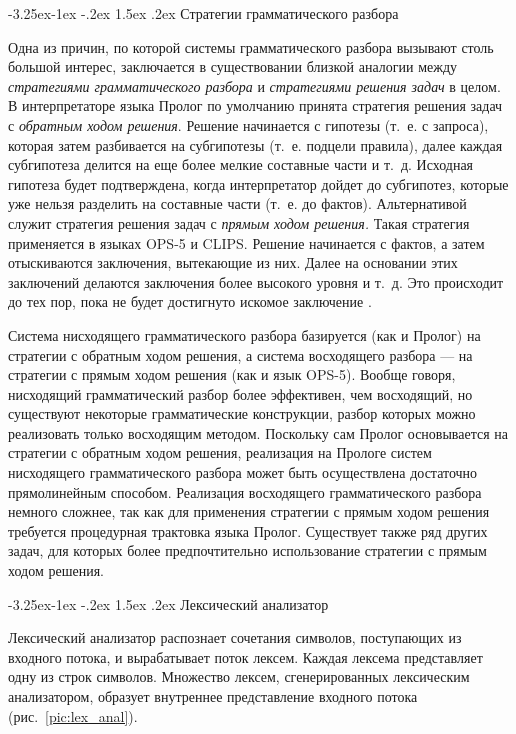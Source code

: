 \documentclass[12pt, openany, twoside]{book} %
\makeatletter
\renewcommand\subsection{\@startsection{subsection}{2}{\z@}%
                                     {-3.25ex\@plus -1ex \@minus -.2ex}%
                                     {1.5ex \@plus .2ex}%
                                     {\normalfont\normalsize\bfseries}}
\makeatother
\begin{document}
\subsection{Стратегии грамматического разбора}

Одна из причин, по которой системы грамматического разбора вызывают столь большой интерес, заключается в существовании близкой аналогии между \emph{стратегиями грамматического разбора} и \emph{стратегиями решения задач} в целом. В интерпретаторе языка Пролог по умолчанию принята стратегия решения задач с \emph{обратным ходом решения}. Решение начинается с гипотезы (т.~е. с запроса), которая затем разбивается на субгипотезы (т.~е. подцели правила), далее каждая субгипотеза делится на еще более мелкие составные части и т.~д. Исходная гипотеза будет подтверждена, когда интерпретатор дойдет до субгипотез, которые уже нельзя разделить на составные части (т.~е. до фактов). Альтернативой служит стратегия решения задач с \emph{прямым ходом решения.} Такая стратегия применяется в языках OPS-5 и CLIPS. Решение начинается с фактов, а затем отыскиваются заключения, вытекающие из них. Далее на основании этих заключений делаются заключения более высокого уровня и т.~д. Это происходит до тех пор, пока не будет достигнуто искомое заключение \cite{Malpas}.

Система нисходящего грамматического разбора базируется (как и Пролог) на стратегии с обратным ходом решения, а система восходящего разбора --- на стратегии с прямым ходом решения (как и язык OPS-5). Вообще говоря, нисходящий грамматический разбор более эффективен, чем восходящий, но существуют некоторые грамматические конструкции, разбор которых можно реализовать только восходящим методом. Поскольку сам Пролог основывается на стратегии с обратным ходом решения, реализация на Прологе систем нисходящего грамматического разбора может быть осуществлена достаточно прямолинейным способом. Реализация восходящего грамматического разбора немного сложнее, так как для применения стратегии с прямым ходом решения требуется процедурная трактовка языка Пролог. Существует также ряд других задач, для которых более предпочтительно использование стратегии с прямым ходом решения.

\subsection{Лексический анализатор}

Лексический анализатор распознает сочетания символов, поступающих из входного потока, и вырабатывает поток лексем. Каждая лексема представляет одну из строк символов. Множество лексем, сгенерированных лексическим анализатором, образует внутреннее представление входного потока (рис.~\ref{pic:lex_anal}).
\end{document}
